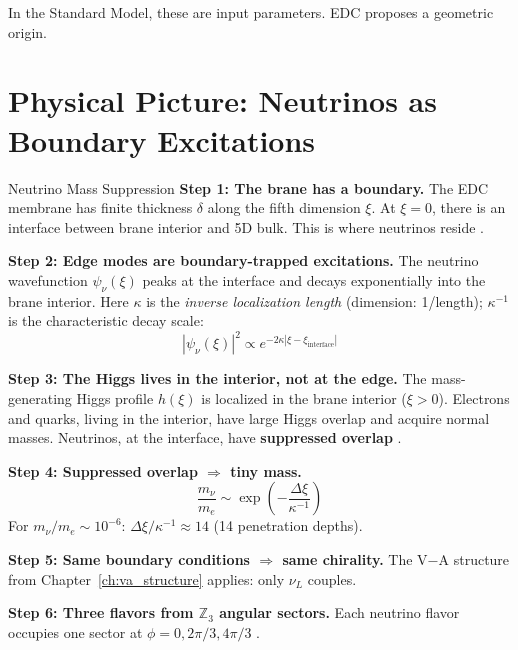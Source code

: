 In the Standard Model, these are input parameters. EDC proposes a geometric origin.

\section{Physical Picture: Neutrinos as Boundary Excitations}
\label{sec:nu_physical}

\begin{mechanism}{Neutrino Mass Suppression}
\textbf{Step 1: The brane has a boundary.}
The EDC membrane has finite thickness $\delta$ along the fifth dimension $\xi$.
At $\xi = 0$, there is an interface between brane interior and 5D bulk.
This is where neutrinos reside \tagP{}.

\textbf{Step 2: Edge modes are boundary-trapped excitations.}
The neutrino wavefunction $\psi_\nu(\xi)$ peaks at the interface and decays
exponentially into the brane interior.
Here $\kappa$ is the \emph{inverse localization length} (dimension: 1/length);
$\kappa^{-1}$ is the characteristic decay scale:
\begin{equation}
    |\psi_\nu(\xi)|^2 \propto e^{-2\kappa |\xi - \xi_{\text{interface}}|}
\end{equation}

\textbf{Step 3: The Higgs lives in the interior, not at the edge.}
The mass-generating Higgs profile $h(\xi)$ is localized in the brane interior
($\xi > 0$). Electrons and quarks, living in the interior, have large Higgs
overlap and acquire normal masses. Neutrinos, at the interface, have
\textbf{suppressed overlap} \tagDc{}.

\textbf{Step 4: Suppressed overlap $\Rightarrow$ tiny mass.}
\begin{equation}
    \frac{m_\nu}{m_e} \sim \exp\left(-\frac{\Delta\xi}{\kappa^{-1}}\right)
\end{equation}
For $m_\nu/m_e \sim 10^{-6}$: $\Delta\xi/\kappa^{-1} \approx 14$ (14 penetration depths).

\textbf{Step 5: Same boundary conditions $\Rightarrow$ same chirality.}
The V$-$A structure from Chapter~\ref{ch:va_structure} applies: only $\nu_L$ couples.

\textbf{Step 6: Three flavors from $\mathbb{Z}_3$ angular sectors.}
Each neutrino flavor occupies one sector at $\phi = 0, 2\pi/3, 4\pi/3$ \tagI{}.
\end{mechanism}

